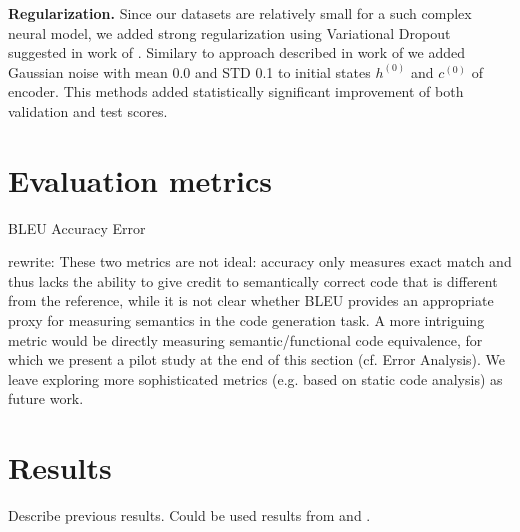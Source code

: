 \textbf{Regularization.} Since our datasets are relatively small for  a such complex neural model, we added strong regularization using Variational Dropout suggested in work of \cite{Gal2016}. Similary to approach described in work of \cite{zimmermann2012} we added Gaussian noise with mean 0.0 and STD 0.1 to initial states $h^{(0)}$ and $c^{(0)}$ of encoder. This methods added statistically significant improvement of both validation and test scores.

\section{Evaluation metrics}
BLEU
Accuracy
Error

rewrite: These two metrics are not ideal: accuracy only measures exact match and thus lacks the ability to give credit to semantically correct code that is different from the reference, while it is not clear whether BLEU provides an appropriate proxy for measuring semantics in the code generation task. A more
intriguing metric would be directly measuring semantic/functional code equivalence, for which we present a pilot study
at the end of this section (cf. Error Analysis). We leave exploring more sophisticated metrics (e.g. based on static code
analysis) as future work.

\section{Results}

Describe previous results. Could be used results from \cite{Yin2017} and \cite{Barone2017}.


